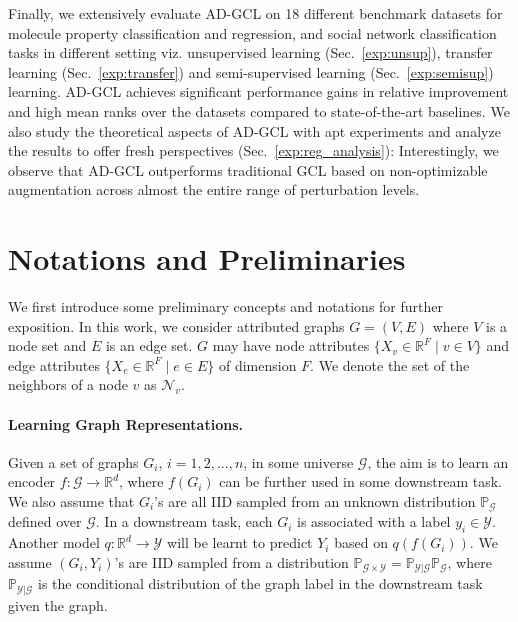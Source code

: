 Finally, we extensively evaluate AD-GCL on 18 different benchmark datasets for molecule property classification and regression, and social network classification tasks in different setting viz. unsupervised learning (Sec.~\ref{exp:unsup}), transfer learning (Sec.~\ref{exp:transfer}) and semi-supervised learning (Sec.~\ref{exp:semisup}) learning. AD-GCL achieves significant performance gains in relative improvement and high mean ranks over the datasets compared to state-of-the-art baselines. %
We also study the theoretical aspects of AD-GCL with apt experiments and analyze the results to offer fresh perspectives (Sec.~\ref{exp:reg_analysis}): Interestingly, we observe that AD-GCL outperforms traditional GCL based on non-optimizable augmentation across almost the entire range of perturbation levels.  
\vspace{-3mm}
\section{Notations and Preliminaries}
\vspace{-2mm}
We first introduce some preliminary concepts and notations for further exposition. In this work, we consider attributed graphs $G =(V,E)$ where $V$ is a node set and $E$ is an edge set. $G$ may have node attributes $\{X_{v} \in \mathbb{R}^F \mid v \in V\}$ and edge attributes $\{X_{e} \in \mathbb{R}^F \mid e \in E\}$ of dimension $F$. We denote the set of the neighbors of a node $v$ as $\mathcal{N}_v$. \vspace{-2mm}
\paragraph{Learning Graph Representations.} 
Given a set of graphs $G_i$, $i=1,2,...,n$, in some universe $\mathcal{G}$, the aim is to learn an encoder $f:\mathcal{G}\rightarrow \mathbb{R}^d$, where $f(G_i)$ can be further used in some downstream task. %
We also assume that $G_i$'s are all IID sampled from an unknown distribution $\mathbb{P}_{\mathcal{G}}$ defined over $\mathcal{G}$. %
In a downstream task, each $G_i$ is associated with a label $y_i\in\mathcal{Y}$. Another model $q:\mathbb{R}^d\rightarrow \mathcal{Y}$ will be learnt to predict $Y_i$ based on $q(f(G_i))$. We assume $(G_i, Y_i)$'s are IID  sampled from a distribution $\mathbb{P}_{\mathcal{G}\times \mathcal{Y}} = \mathbb{P}_{\mathcal{Y}|\mathcal{G}}\mathbb{P}_{\mathcal{G}}$, where $\mathbb{P}_{\mathcal{Y}|\mathcal{G}}$ is the conditional distribution of the graph label in the downstream task given the graph. 
